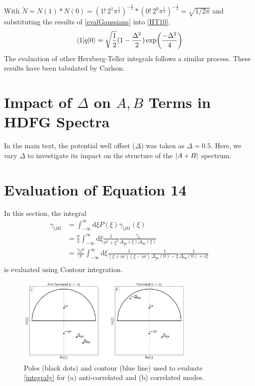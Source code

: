 \documentclass[aip, jcp, reprint, onecolumn, nofootinbib]{revtex4-2}
\begin{document}
With $\tilde{N} = N(1)*N(0) = (1! \ 2^1 \pi^{\frac{1}{2}})^{-\frac{1}{2}} * (0! \ 2^0 \pi^{\frac{1}{2}})^{-\frac{1}{2}} = \sqrt{1/2\pi}$ and substituting the results of \autoref{evalGaussians} into \autoref{HT10}, 
\begin{equation}
	\mel{1}{q}{0} = \sqrt{\frac{1}{2}} (1 - \frac{\Delta^2}{2}) \exp(\frac{-\Delta^2}{4})
\end{equation}
The evaluation of other Herzberg-Teller integrals follows a similar process.
These results have been tabulated by Carlson. \cite{Carlson1988thesis}

\section{Impact of $\Delta$ on $A,B$ Terms in HDFG Spectra}
In the main text, the potential well offset ($\Delta$) was taken as $\Delta = 0.5$.
Here, we vary $\Delta$ to investigate its impact on the structure of the $\abs{A+B}$ spectrum.

\section{Evaluation of Equation 14}
In this section, the integral
\begin{equation}
	\begin{split}
		\gamma_{ijkl} &= \int_{-\infty}^\infty \mathrm{d}\xi P(\xi) \gamma_{ijkl}(\xi)\\
		&=\frac{\sigma}{\pi}\int_{-\infty}^\infty \mathrm{d}\xi \frac{1}{\sigma^2 + \xi^2} \frac{\gamma_0}{\Delta_{ga}(\xi)\Delta_{ba}(\xi)} \\
		&= \frac{\gamma_0 \sigma}{\pi} \int_{-\infty}^\infty \mathrm{d}\xi\frac{1}{(\xi + i\sigma)(\xi - i\sigma)} \frac{1}{\Delta_{ga}(0) - \xi} \frac{1}{\Delta_{ba}(0) + c\xi}\\
	\end{split}
\end{equation}
is evaluated using Contour integration.
\begin{figure}[!htbp]
	\centering
	\includegraphics[width=3.375in]{figures/corr_contour.png}
	\caption{Poles (black dots) and contour (blue line) used to evaluate \autoref{integraly} for (a) anti-correlated and (b) correlated modes.} 
	\label{fig:contours}
\end{figure}
\end{document}
